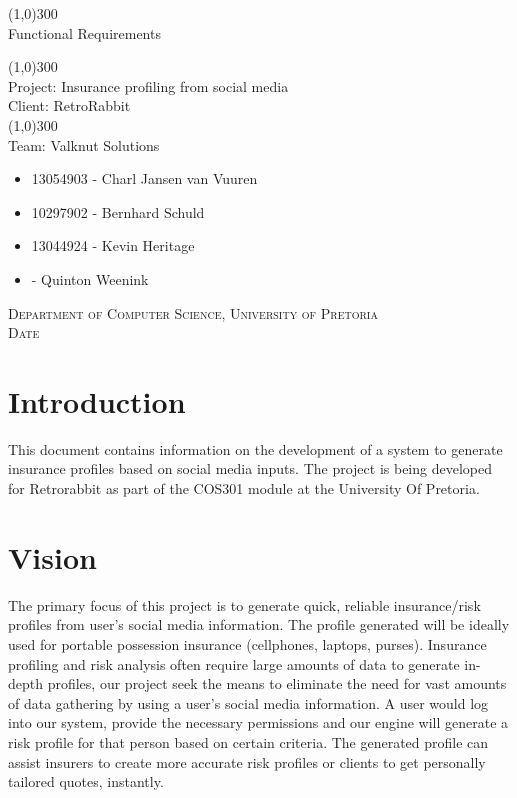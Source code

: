\documentclass{article}
\begin{document}
	\begin{titlepage}
		\begin{center}
		
			\line(1,0){300}\\
			[6mm]
			\huge{
			Functional Requirements\\
			}
			
			\line(1,0){300}\\
			\huge{Project: Insurance profiling from social media\\
			Client: RetroRabbit} \\
			\line(1,0){300}\\
			\huge{Team: Valknut Solutions}
			
			\large
			{
			\begin{itemize}
			
				\item 13054903 - Charl Jansen van Vuuren 
				\item 10297902 - Bernhard Schuld      
				\item 13044924 - Kevin Heritage
				\item 	- Quinton Weenink
			\end{itemize}
			}
		\textsc{\large  Department of Computer Science, University of Pretoria}\\
		[0.5cm]
		\textsc{\large Date}	
		\end{center}

			
	\end{titlepage}
	\cleardoublepage
	\tableofcontents
	\cleardoublepage
	\listoffigures
	\cleardoublepage
\section{Introduction}
This document contains information on the development of a system to generate insurance profiles based on social media inputs. The project is being developed for Retrorabbit as part of the COS301 module at the University Of Pretoria.
\section{Vision}
The primary focus of this project is to generate quick, reliable insurance/risk profiles from user's social media information. The profile generated will be ideally used for portable possession insurance (cellphones, laptops, purses). Insurance profiling and risk analysis often require large amounts of data to generate in-depth profiles, our project seek the means to eliminate the need for vast amounts of data gathering by using a user's social media information. A user would log into our system, provide the necessary permissions and our engine will generate a risk profile for that person based on certain criteria. The generated profile can assist insurers to create more accurate risk profiles or clients to get personally tailored quotes, instantly.
\end{document}
